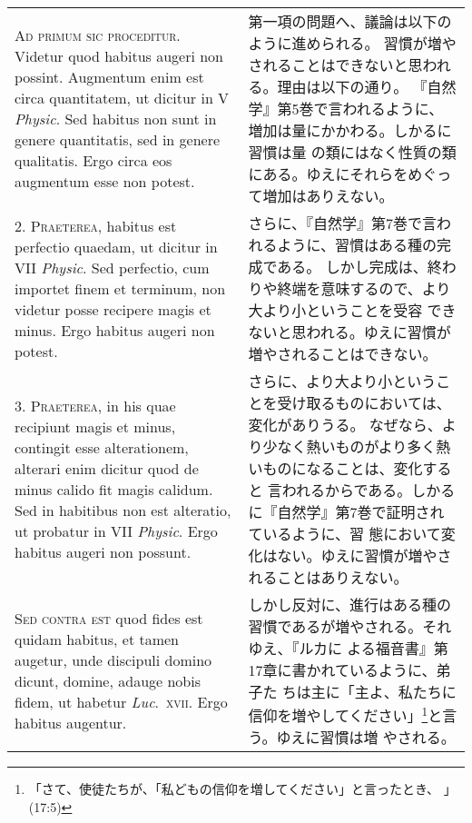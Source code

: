 \documentclass[10pt]{jsarticle} %
\begin{document}
\begin{longtable}{p{21em}p{21em}}

{\scshape Ad primum sic proceditur}. Videtur quod habitus augeri non
possint. Augmentum enim est circa quantitatem, ut dicitur in V
{\itshape Physic}. Sed habitus non sunt in genere quantitatis, sed in genere
qualitatis. Ergo circa eos augmentum esse non potest.

&

第一項の問題へ、議論は以下のように進められる。
習慣が増やされることはできないと思われる。理由は以下の通り。
『自然学』第5巻で言われるように、増加は量にかかわる。しかるに習慣は量
 の類にはなく性質の類にある。ゆえにそれらをめぐって増加はありえない。

\\


2. {\scshape Praeterea}, habitus est perfectio quaedam, ut dicitur in VII
{\itshape Physic}. Sed perfectio, cum importet finem et terminum, non videtur
posse recipere magis et minus. Ergo habitus augeri non potest.

&

さらに、『自然学』第7巻で言われるように、習慣はある種の完成である。
しかし完成は、終わりや終端を意味するので、より大より小ということを受容
 できないと思われる。ゆえに習慣が増やされることはできない。

\\


3. {\scshape Praeterea}, in his quae recipiunt magis et minus, contingit esse
alterationem, alterari enim dicitur quod de minus calido fit magis
calidum. Sed in habitibus non est alteratio, ut probatur in VII
{\itshape Physic}. Ergo habitus augeri non possunt.

&

さらに、より大より小ということを受け取るものにおいては、変化がありうる。
なぜなら、より少なく熱いものがより多く熱いものになることは、変化すると
言われるからである。しかるに『自然学』第7巻で証明されているように、習
態において変化はない。ゆえに習慣が増やされることはありえない。

\\


{\scshape Sed contra est} quod fides est quidam habitus, et tamen augetur, unde
discipuli domino dicunt, domine, adauge nobis fidem, ut habetur
{\itshape Luc}.~{\scshape xvii}. Ergo habitus augentur.

&

しかし反対に、進行はある種の習慣であるが増やされる。それゆえ、『ルカに
よる福音書』第17章に書かれているように、弟子た
ちは主に「主よ、私たちに信仰を増やしてください」\footnote{「さて、使徒たちが、「私どもの信仰を増してください」と言ったとき、 」(17:5)}と言う。ゆえに習慣は増
やされる。


\end{longtable}
\end{document}
